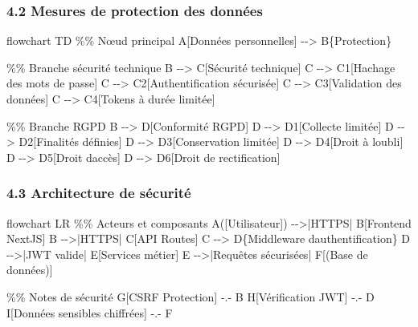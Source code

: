 \documentclass[
]{article}
\newenvironment{Shaded}{}{}
\newcommand{\NormalTok}[1]{#1}
\begin{document}
\subsubsection{4.2 Mesures de protection des
données}\label{mesures-de-protection-des-donnuxe9es}

\begin{Shaded}
\begin{Highlighting}[]
\NormalTok{flowchart TD}
\NormalTok{    \%\% Nœud principal}
\NormalTok{    A[Données personnelles] {-}{-}\textgreater{} B\{Protection\}}
    
\NormalTok{    \%\% Branche sécurité technique}
\NormalTok{    B {-}{-}\textgreater{} C[Sécurité technique]}
\NormalTok{    C {-}{-}\textgreater{} C1[Hachage des mots de passe]}
\NormalTok{    C {-}{-}\textgreater{} C2[Authentification sécurisée]}
\NormalTok{    C {-}{-}\textgreater{} C3[Validation des données]}
\NormalTok{    C {-}{-}\textgreater{} C4[Tokens à durée limitée]}
    
\NormalTok{    \%\% Branche RGPD}
\NormalTok{    B {-}{-}\textgreater{} D[Conformité RGPD]}
\NormalTok{    D {-}{-}\textgreater{} D1[Collecte limitée]}
\NormalTok{    D {-}{-}\textgreater{} D2[Finalités définies]}
\NormalTok{    D {-}{-}\textgreater{} D3[Conservation limitée]}
\NormalTok{    D {-}{-}\textgreater{} D4[Droit à l\textquotesingle{}oubli]}
\NormalTok{    D {-}{-}\textgreater{} D5[Droit d\textquotesingle{}accès]}
\NormalTok{    D {-}{-}\textgreater{} D6[Droit de rectification]}
\end{Highlighting}
\end{Shaded}

\subsubsection{4.3 Architecture de
sécurité}\label{architecture-de-suxe9curituxe9}

\begin{Shaded}
\begin{Highlighting}[]
\NormalTok{flowchart LR}
\NormalTok{    \%\% Acteurs et composants}
\NormalTok{    A([Utilisateur]) {-}{-}\textgreater{}|HTTPS| B[Frontend NextJS]}
\NormalTok{    B {-}{-}\textgreater{}|HTTPS| C[API Routes]}
\NormalTok{    C {-}{-}\textgreater{} D\{Middleware d\textquotesingle{}authentification\}}
\NormalTok{    D {-}{-}\textgreater{}|JWT valide| E[Services métier]}
\NormalTok{    E {-}{-}\textgreater{}|Requêtes sécurisées| F[(Base de données)]}
    
\NormalTok{    \%\% Notes de sécurité}
\NormalTok{    G[CSRF Protection] {-}.{-} B}
\NormalTok{    H[Vérification JWT] {-}.{-} D}
\NormalTok{    I[Données sensibles chiffrées] {-}.{-} F}
\end{Highlighting}
\end{Shaded}
\end{document}
